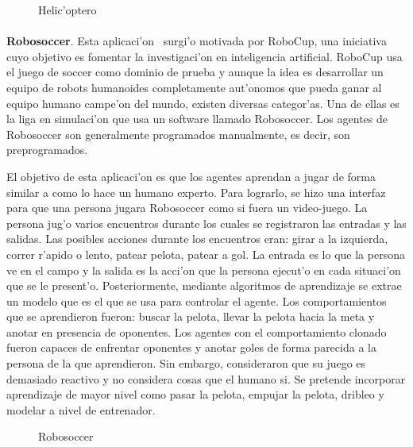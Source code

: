 \documentclass[11pt]{article}
\begin{document}
\begin{figure}[h]

\centering
{}
\caption[Helic'optero]{Helic'optero} 
\label{fig:helicoptero}

\end{figure}

\paragraph{}
\noindent
\textbf{Robosoccer}. Esta aplicaci'on~\cite{soccerAler} surgi'o motivada por RoboCup, una iniciativa cuyo objetivo es fomentar la investigaci'on en inteligencia artificial. RoboCup usa el juego de soccer como dominio de prueba y aunque la idea es desarrollar un equipo de robots humanoides completamente aut'onomos que pueda ganar al equipo humano campe'on del mundo, existen diversas categor'as. Una de ellas es la liga en simulaci'on que usa un software llamado Robosoccer. Los agentes de Robosoccer son generalmente programados manualmente, es decir, son preprogramados. 

El objetivo de esta aplicaci'on es que los agentes aprendan a jugar de forma similar a como lo hace un humano experto. Para lograrlo, se hizo una interfaz para que una persona jugara Robosoccer como si fuera un video-juego. La persona jug'o varios encuentros durante los cuales se registraron las entradas y las salidas. Las posibles acciones durante los encuentros eran: girar a la izquierda, correr r'apido o lento, patear pelota, patear a gol. La entrada es lo que la persona ve en el campo y la salida es la acci'on que la persona ejecut'o en cada situaci'on que se le present'o. Posteriormente, mediante algoritmos de aprendizaje se extrae un modelo que es el que se usa para controlar el agente. Los comportamientos que se aprendieron fueron: buscar la pelota, llevar la pelota hacia la meta y anotar en presencia de oponentes. Los agentes con el comportamiento clonado fueron capaces de enfrentar oponentes y anotar goles de forma parecida a la persona de la que aprendieron. Sin embargo, consideraron que su juego es demasiado reactivo y no considera cosas que el humano si. Se pretende incorporar aprendizaje de mayor nivel como pasar la pelota, empujar la pelota, dribleo y modelar a nivel de entrenador.

\begin{figure}[h]

\centering
{}
\caption[Robosoccer]{Robosoccer} 
\label{fig:robosoc}

\end{figure}
\end{document}
